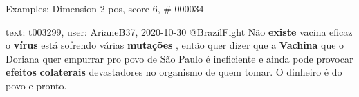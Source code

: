 \begin{frame}{Examples: Dimension 2 pos, score 6, \# 000034}
\footnotesize
\begin{exampleblock}{text: t003299, user: ArianeB37, 2020-10-30}
@BrazilFight Não \textbf{existe} vacina eficaz o \textbf{vírus} está sofrendo 
várias \textbf{mutações} , então quer dizer que a \textbf{Vachina} que o 
Doriana quer empurrar pro povo de São Paulo é ineficiente e ainda pode provocar 
\textbf{efeitos} \textbf{colaterais} devastadores no organismo de quem tomar. O 
dinheiro é do povo e pronto. 
\end{exampleblock}
\end{frame}
